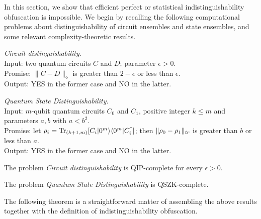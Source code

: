 \documentclass[envcountsame]{llncs}
\DeclareMathOperator{\tr}{Tr}
\numberwithin{equation}{section}
\begin{document}
In this section, we show that efficient perfect or statistical indistinguishability obfuscation is impossible. We begin by recalling the following computational problems about distinguishability of circuit ensembles and state ensembles, and some relevant complexity-theoretic results.

\begin{problem} \textsf{\emph{Circuit distinguishability}}.\\
\indent Input: two quantum circuits $C$ and $D$; parameter $\epsilon > 0$. \\
\indent Promise: $\|C - D\|_\diamond$ is greater than $2 - \epsilon$ or less than $\epsilon$.\\
\indent Output: YES in the former case and NO in the latter.
\end{problem}

\begin{problem} \textsf{\emph{Quantum State Distinguishability}}.\\
\indent Input: $m$-qubit quantum circuits $C_0$ and $C_1$, positive integer $k \leq m$ and parameters $a,b$ with $a<b^2$.\\
\indent Promise: let $\rho_i = \tr_{(k+1, m)}[C_i\ket{0^m}\bra{0^m}C_i^\dagger]$; then $\|\rho_0 - \rho_1\|_\emph{tr}$ is greater than $b$ or less than $a$.\\
\indent Output: YES in the former case and NO in the latter.
\end{problem}

\begin{theorem}\label{thm:QCD}
\emph{\cite{RW05}} The problem \textsf{\emph{Circuit distinguishability}} is QIP-complete for every $\epsilon > 0$. 
\end{theorem}

\begin{theorem}\label{thm:QSD}
\emph{\cite{Watrous02}} The problem \textsf{\emph{Quantum State Distinguishability}} is QSZK-complete.
\end{theorem}

The following theorem is a straightforward matter of assembling the above results together with the definition of indistinguishability obfuscation.
\end{document}
